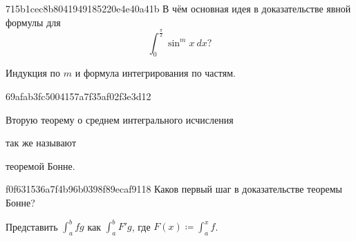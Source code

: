 \begin{note}{715b1cec8b8041949185220e4e40a41b}
    В чём основная идея в доказательстве явной формулы для
    \[
        \int_{0}^{\frac{\pi}{2}} \sin^{m} x\: dx?
    \]

    \begin{cloze}{1}
        Индукция по \({ m }\) и формула интегрирования по частям.
    \end{cloze}
\end{note}


\begin{note}{69afab3fc5004157a7f35af02f3e3d12}
    \begin{icloze}{2}Вторую теорему о среднем интегрального исчисления\end{icloze} так же называют \begin{icloze}{1}теоремой Бонне.\end{icloze}
\end{note}

\begin{note}{f0f631536a7f4b96b0398f89ecaf9118}
    Каков первый шаг в доказательстве теоремы Бонне?

    \begin{cloze}{1}
        Представить \({ \int_{a}^{b} fg }\) как \({ \int_{a}^{b} F'g }\), где \({ F(x) \coloneqq \int_{a}^{x} f }\).
    \end{cloze}
\end{note}

